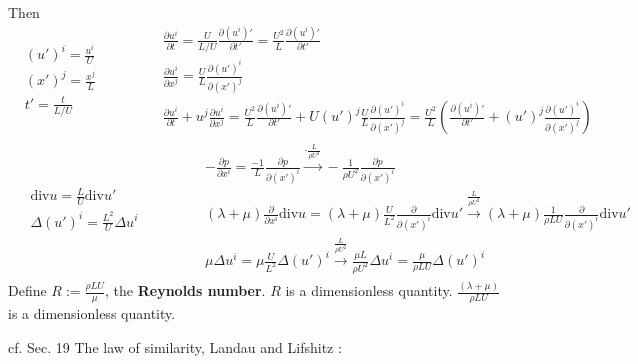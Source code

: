 \documentclass[twoside,landscape,10pt]{amsart}
\theoremstyle{plain}
\theoremstyle{definition}
\theoremstyle{remark}
\theoremstyle{remark}
\begin{document}
\begin{multicols*}{2}
Then
\[
\begin{aligned}
  & (u')^i = \frac{u^i}{U} \\ 
  & (x')^j = \frac{x^j}{L} \\ 
  & t' = \frac{t}{ L/U}
\end{aligned} \quad \quad \quad \, \begin{aligned}
  & \frac{ \partial u^i}{ \partial t} = \frac{U}{ L/U} \frac{ \partial (u^i)' }{ \partial t'} = \frac{U^2}{L} \frac{ \partial (u^i)' }{ \partial t' } \\ 
  & \frac{ \partial u^i }{ \partial x^j} = \frac{U}{L} \frac{ \partial (u')^i }{ \partial (x')^j } \\
  & \frac{ \partial u^i}{ \partial t} + u^j \frac{ \partial u^i}{ \partial x^j} = \frac{U^2}{L} \frac{ \partial (u^i)' }{ \partial t' } + U (u')^j \frac{U}{L} \frac{ \partial (u')^i }{ \partial (x')^j } = \frac{U^2}{L} \left( \frac{ \partial (u^i)' }{ \partial t' } + (u')^j \frac{ \partial (u')^i }{ \partial (x')^j } \right)
\end{aligned}
\]
\[
\begin{gathered}
  \begin{aligned}
    & \text{div}u = \frac{L}{U} \text{div}u' \\ 
    & \Delta (u')^i = \frac{L^2}{U} \Delta u^i
  \end{aligned} \quad \quad \quad \, \begin{aligned} 
    & - \frac{ \partial p}{ \partial x^i} = \frac{-1}{L} \frac{ \partial p}{ \partial (x')^i } \xrightarrow{ \cdot \frac{L}{ \rho U^2} } -\frac{1}{ \rho U^2} \frac{ \partial p }{ \partial (x')^i } \\
    & (\lambda + \mu) \frac{ \partial }{ \partial x^i} \text{div}u = (\lambda + \mu) \frac{U}{L^2} \frac{ \partial }{ \partial (x')^i } \text{div}u' \xrightarrow{ \frac{L}{ \rho U^2} } (\lambda + \mu ) \frac{1}{ \rho LU } \frac{ \partial }{ \partial (x')^i } \text{div}u' \\
    & \mu \Delta u^i = \mu \frac{U}{ L^2} \Delta (u')^i \xrightarrow{ \frac{L}{ \rho U^2} } \frac{ \mu L}{ \rho U^2} \Delta u^i = \frac{ \mu }{ \rho LU} \Delta(u')^i
\end{aligned}
\end{gathered}
\]
Define $R:= \frac{ \rho LU }{ \mu }$, the \textbf{Reynolds number}.  $R$ is a dimensionless quantity.  $\frac{(\lambda + \mu )}{ \rho L U}$ is a dimensionless quantity.  

cf. Sec. 19 The law of similarity, Landau and Lifshitz \cite{LLandauELifshitz1987}:


\end{multicols*}
\end{document}
